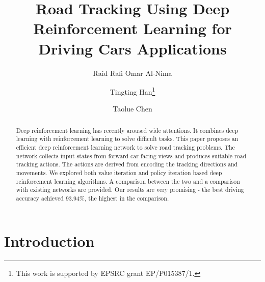 \documentclass{svproc}
\begin{document}
\mainmatter              %
%
\title{Road Tracking Using Deep Reinforcement Learning for Driving Cars Applications}
%
%
\author{Raid Rafi Omar Al-Nima \and Tingting Han\thanks{This work is supported by EPSRC grant EP/P015387/1.} \and 
	Taolue Chen}
%
%
%

\maketitle              %

\begin{abstract}
Deep reinforcement learning has recently aroused wide attentions. It combines deep learning with reinforcement learning to solve difficult tasks. This paper proposes an efficient deep reinforcement learning network to solve road tracking problems. The network collects input states from forward car facing views and produces suitable road tracking actions. The actions are derived from encoding the tracking directions and movements. We explored both value iteration and policy iteration based deep reinforcement learning algorithms. A comparison between the two and a comparison with existing networks are provided. Our results are very promising - the best driving accuracy achieved 93.94\%, the highest in the comparison. 
\end{abstract}


\section{Introduction}
\end{document}

